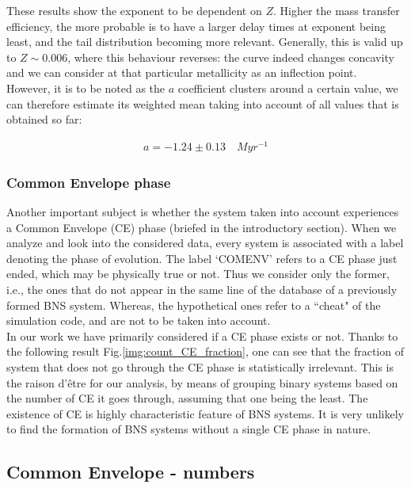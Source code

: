 \documentclass[preprint,12pt]{elsarticle}
\begin{document}
These results show the exponent to be dependent on $Z$. Higher the mass transfer efficiency, the more probable is to have a larger delay times at exponent being least, and the tail distribution becoming more relevant. Generally, this is valid up to $Z \sim 0.006$, where this behaviour reverses: the curve indeed changes concavity and we can consider at that particular metallicity as an inflection point.\\
However, it is to be noted as the $a$ coefficient clusters around a certain value, we can therefore estimate its weighted mean taking into account of all values that is obtained so far:

\begin{align}
   a = -1.24 \pm 0.13 \quad Myr^{-1}
   \label{value:a_coefficient}
\end{align}


\subsubsection{\textbf{Common Envelope phase}}
Another important subject is whether the system taken into account experiences a Common Envelope (CE) phase (briefed in the introductory section). When we analyze and look into the considered data, every system is associated with a label denoting the phase of evolution. The label `COMENV' refers to a CE phase just ended, which may be physically true or not. Thus we consider only the former, i.e., the ones that do not appear in the same line of the database of a previously formed BNS system. Whereas, the hypothetical ones refer to a ``cheat" of the simulation code, and are not to be taken into account.\\
In our work we have primarily considered if a CE phase exists or not. Thanks to the following result Fig.\ref{img:count_CE_fraction}, one can see that the fraction of system that does not go through the CE phase is statistically irrelevant. This is the raison d'être for our analysis, by means of grouping binary systems based on the number of CE it goes through, assuming that one being the least. The existence of CE is highly characteristic feature of BNS systems. It is very unlikely to find the formation of BNS systems without a single CE phase in nature. 


\subsection{\textbf{Common Envelope - numbers}}
\end{document}
